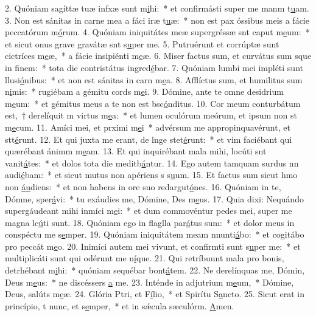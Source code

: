 2. Quóniam sagíttæ tuæ infxæ sunt m\uline{i}hi:~* et confirmásti super me manm t\uline{u}am.
3. Non est sánitas in carne mea a fáci iræ t\uline{u}æ:~* non est pax óssibus meis a fácie peccatórum m\uline{ó}rum.
4. Quóniam iniquitátes meæ supergréssæ snt caput m\uline{e}um:~* et sicut onus grave gravátæ snt s\uline{u}per me.
5. Putruérunt et corrúptæ sunt cictríces m\uline{e}æ,~* a fácie insipiénti m\uline{e}æ.
6. Miser factus sum, et curvátus sum sque in f\uline{i}nem:~* tota die contristátus ingred\uline{é}bar.
7. Quóniam lumbi mei impléti sunt llusi\uline{ó}nibus:~* et non est sánitas in carn m\uline{e}a.
8. Afflíctus sum, et humilitus sum n\uline{i}mis:~* rugiébam a gémitu cords m\uline{e}i.
9. Dómine, ante te omne desidrium m\uline{e}um:~* et gémitus meus a te non est bsc\uline{ó}nditus.
10. Cor meum conturbátum est,~† derelíquit m virtus m\uline{e}a:~* et lumen oculórum meórum, et ipsum non st m\uline{e}cum.
11. Amíci mei, et prximi m\uline{e}i~* advérsum me appropinquavérunt, et stt\uline{é}runt.
12. Et qui juxta me erant, de lnge stet\uline{é}runt:~* et vim faciébant qui quærébant ánimm m\uline{e}am.
13. Et qui inquirébant mala mihi, locúti snt vanit\uline{á}tes:~* et dolos tota die meditb\uline{á}ntur.
14. Ego autem tamquam surdus nn audi\uline{é}bam:~* et sicut mutus non apériens s s\uline{u}um.
15. Et factus sum sicut hmo non \uline{áu}diens:~* et non habens in ore suo redargut\uline{ó}nes.
16. Quóniam in te, Dómne, sper\uline{á}vi:~* tu exáudies me, Dómine, Des m\uline{e}us.
17. Quia dixi: Nequándo supergáudeant mihi inmíci m\uline{e}i:~* et dum commovéntur pedes mei, super me magna lc\uline{ú}ti sunt.
18. Quóniam ego in flaglla par\uline{á}tus sum:~* et dolor meus in conspéctu me s\uline{e}mper.
19. Quóniam iniquitátem meam nnunti\uline{á}bo:~* et cogitábo pro peccát m\uline{e}o.
20. Inimíci autem mei vivunt, et confirmti sunt s\uline{u}per me:~* et multiplicáti sunt qui odérunt me n\uline{í}que.
21. Qui retríbuunt mala pro bonis, detrhébant m\uline{i}hi:~* quóniam sequébar bont\uline{á}tem.
22. Ne derelínquas me, Dómin, Deus m\uline{e}us:~* ne discéssers \uline{a} me.
23. Inténde in adjutrium m\uline{e}um,~* Dómine, Deus, salúts m\uline{e}æ.
24. Glória Ptri, et F\uline{í}lio,~* et Spirítu S\uline{a}ncto.
25. Sicut erat in princípio, t nunc, et s\uline{e}mper,~* et in sǽcula sæculórm. \uline{A}men.
